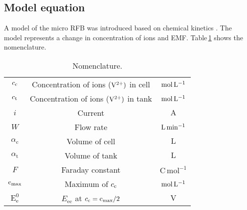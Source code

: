 \documentclass[a4paper]{article}
\newcommand{\tabref}[1]{Table\,\ref{#1}}
\newcommand{\vII}{{\rm V^{2+}}}
\newcommand{\Cc}{c_{\rm c}}
\newcommand{\Ct}{c_{\rm t}}
\newcommand{\Cmax}{{\rm c_{max}}}
\newcommand{\ac}{\alpha_\mathrm{c}}
\newcommand{\at}{\alpha_\mathrm{t}}
\newcommand{\Eeo}{\mathrm{E_\mathrm{e}^0}}
\newcommand{\Eec}{E_\mathrm{ec}}
\newcommand{\M}{{\rm mol\,L^{-1}}}
\newcommand{\fr}{{\rm L\,min^{-1}}}
\begin{document}
\subsection{Model equation}
A model of the micro RFB was introduced based on chemical kinetics \cite{model-minghua-dynamical-simulation}. 
The model represents a change in concentration of ions and EMF. 
\tabref{tab:Nomenclature} shows the nomenclature.
\begin{table}[h]
  \centering
  \caption{Nomenclature.}\label{tab:Nomenclature}
   \begin{tabular}{ccc}\hline
    $\Cc$ & Concentration of ions ($\vII)$ in cell & $\M$ \\
    $\Ct$  & Concentration of ions ($\vII)$ in tank& $\M$\\
    $i$ & Current & $\mathrm{A}$\\
    $W$ & Flow rate & $\fr$\\
    $\ac$ & Volume of cell & $\mathrm{L}$ \\ 
    $\at$ & Volume of tank & $\mathrm{L}$ \\
    $F$ & Faraday constant & $\mathrm{C\,mol^{-1}}$ \\
    $\Cmax$ & Maximum of $\Cc$ & $\M$ \\
    $\Eeo$ & $\Eec$ at $\Cc=\Cmax/2$ & $\mathrm{V}$ \\\hline
   \end{tabular}
\end{table}
\end{document}
